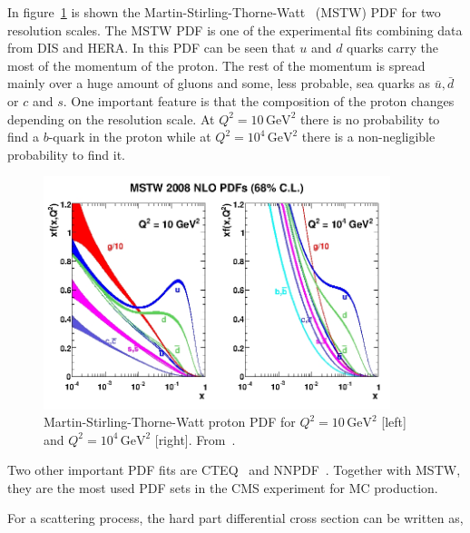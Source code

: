 In figure~\ref{fig:MSTW} is shown the Martin-Stirling-Thorne-Watt~\cite{Martin:2009iq} (MSTW) PDF for two resolution scales. The MSTW PDF is one of the experimental fits combining data from DIS and HERA. In this PDF can be seen that $u$ and $d$ quarks carry the most of the momentum of the proton. The rest of the momentum is spread mainly over a huge amount of gluons and some, less probable, sea quarks as $\bar{u}, \bar{d}$ or $c$ and $s$. One important feature is that the composition of the proton changes depending on the resolution scale. At $Q^{2}= 10\, \text{GeV}^{2}$ there is no probability to find a $b$-quark in the proton while at $Q^{2}= 10^{4}\, \text{GeV}^{2}$ there is a non-negligible probability to find it.

\begin{figure}[!Hhtbp]
  \begin{center}
    \includegraphics[width=0.9\textwidth]{figs/mstw2008nlo68cl_allpdfs.jpg}
    \caption{Martin-Stirling-Thorne-Watt proton PDF for $Q^{2}= 10\, \text{GeV}^{2}$ [left] and $Q^{2}= 10^{4}\, \text{GeV}^{2}$ [right]. From~\cite{Martin:2009iq}.}
    \label{fig:MSTW}
  \end{center}
\end{figure}

Two other important PDF fits are CTEQ~\cite{Nadolsky:2008zw} and NNPDF~\cite{Ball:2010de}. Together with MSTW, they are the most used PDF sets in the CMS experiment for MC production. 

For a scattering process, the hard part differential cross section can be written as,

